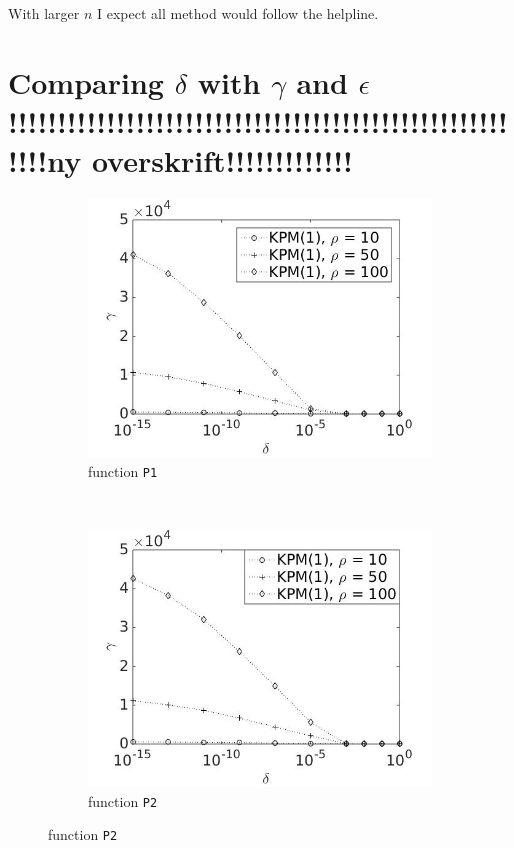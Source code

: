 With larger $n$ I expect all method would follow the helpline.
\section{Comparing $\delta$ with $\gamma$ and $\epsilon$\\!!!!!!!!!!!!!!!!!!!!!!!!!!!!!!!!!!!!!!!!!!!!!!!!!!!!!!!ny overskrift!!!!!!!!!!!!! } \label{sec:div}
\begin{figure}[H]
        \centering
        \begin{subfigure}[b]{0.45\textwidth}
                \includegraphics[width=\textwidth]{fig/s13antvstol1m}
                \caption{function \texttt{P1}}
                \label{fig:errant1}
        \end{subfigure}
~
        \begin{subfigure}[b]{0.45\textwidth}
                \includegraphics[width=\textwidth]{fig/s14antvstol2m}
                \caption{ function \texttt{P2}}
                \label{fig:errant2}
        \end{subfigure}
        

\end{figure}
